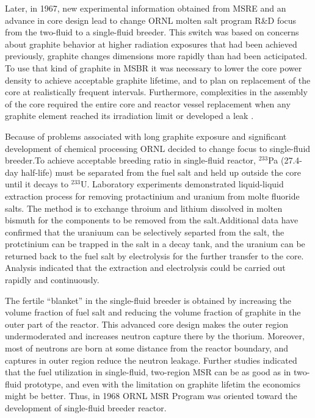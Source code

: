 Later, in 1967, new experimental information obtained from \gls{MSRE} and an advance in core design lead to change \gls{ORNL} molten salt program R\&D focus from the two-fluid to a single-fluid breeder. This switch was based on concerns about graphite behavior at higher radiation exposures that had been achieved previously, graphite changes dimensions more rapidly than had been acticipated. To use that kind of graphite in \gls{MSBR} it was necessary to lower the core power density to achieve acceptable graphite lifetime, and to plan on replacement of the core at realistically frequent intervals. Furthermore, complexities in the assembly of the core required the entire core and reactor vessel replacement when any graphite element reached its irradiation limit or developed a leak \cite{rosenthal_molten-salt_1970}.

Because of problems associated with long graphite exposure and significant development of chemical processing \gls{ORNL} decided to change focus to single-fluid breeder.To achieve acceptable breeding ratio in single-fluid reactor, $^{233}$Pa (27.4-day half-life) must be separated from the fuel salt and held up outside the core until it decays to $^{233}$U. Laboratory experiments demonstrated liquid-liquid extraction process for removing protactinium and uranium from molte fluoride salts. The method is to exchange throium and lithium dissolved in molten bismuth for the components to be removed from the salt.Additional data have confirmed that the uraniuum can be selectively separted from the salt, the protctinium can be trapped in the salt in a decay tank, and the uranium can be returned back to the fuel salt by electrolysis for the further transfer to the core. Analysis indicated that the extraction and electrolysis could be carried out rapidly and continuously.

The fertile ``blanket'' in the single-fluid breeder is obtained by increasing the volume fraction of fuel salt and reducing the volume fraction of graphite in the outer part of the reactor. This advanced core design makes the outer region undermoderated and increases neutron capture there by the thorium. Moreover, most of neutrons are born at some distance from the reactor boundary, and captures in outer region reduce the neutron leakage. Further studies indicated that the fuel utilization in single-fluid, two-region \gls{MSR} can be as good as in two-fluid prototype, and even with the limitation on graphite lifetim the economics might be better. Thus, in 1968 \gls{ORNL} \gls{MSR} Program was oriented toward the development of single-fluid breeder reactor.

